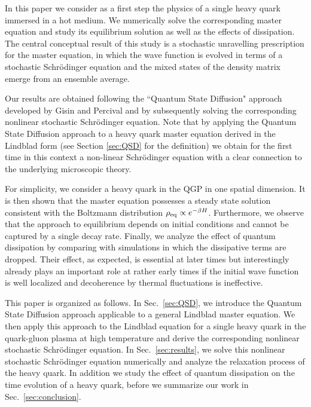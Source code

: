 \documentclass[prd,11pt, amsmath, amsymb, aps, reprint, tightenlines, nofootinbib, longbibliography, abbrv, preprintnumbers]{revtex4-1}
\begin{document}
In this paper we consider as a first step the physics of a single heavy quark immersed in a hot medium.
We numerically solve the corresponding master equation and study its equilibrium solution as well as the effects of dissipation. 
The central conceptual result of this study is a stochastic unravelling prescription for the master equation, in which the wave function is evolved in terms of a stochastic Schr\"odinger equation and the mixed states of the density matrix emerge from an ensemble average.

Our results are obtained following the  ``Quantum State Diffusion" approach developed by Gisin and Percival \cite{gisin1992quantum, percival1998quantum} and by subsequently solving the corresponding nonlinear stochastic Schr\"odinger equation.
Note that by applying the Quantum State Diffusion approach to a heavy quark master equation derived in the Lindblad form \cite{Akamatsu:2014qsa, lindblad1976generators} (see Section \ref{sec:QSD} for the definition) we obtain for the first time in this context a non-linear Schr\"odinger equation with a clear connection to the underlying microscopic theory. 

For simplicity, we consider a heavy quark in the QGP in one spatial dimension.
It is then shown that the master equation possesses a steady state solution consistent with the Boltzmann distribution $\rho_{\rm eq}\propto e^{-\beta H}$.
Furthermore, we observe that the approach to equilibrium depends on initial conditions and cannot be captured by a single decay rate.
Finally, we analyze the effect of quantum dissipation by comparing with simulations in which the dissipative terms are dropped. 
Their effect, as expected, is essential at later times but interestingly already plays an important role at rather early times if the initial wave function is well localized and decoherence by thermal fluctuations is ineffective.

This paper is organized as follows. In Sec.~\ref{sec:QSD}, we introduce the Quantum State Diffusion approach applicable to a general Lindblad master equation.
We then apply this approach to the Lindblad equation for a single heavy quark in the quark-gluon plasma at high temperature and derive the corresponding nonlinear stochastic Schr\"odinger equation.
In Sec.~\ref{sec:results}, we solve this nonlinear stochastic Schr\"odinger equation numerically and analyze the relaxation process of the heavy quark.
In addition we study the effect of quantum dissipation on the time evolution of a heavy quark, before we summarize our work in Sec.~\ref{sec:conclusion}.
\end{document}
